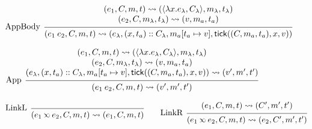 \documentclass[acmsmall,review]{acmart}\settopmatter{printfolios=true,printccs=false,printacmref=false}
\theoremstyle{definition}
\newcommand*{\cons}{::}
\newcommand*{\mem}{m}
\newcommand*{\semlink}{\mathbin{\rotatebox[origin=c]{180}{$\propto$}}}
\newcommand*{\link}[2]{{#1}\semlink{#2}}
\newcommand*{\tick}{\mathsf{tick}}
\begin{document}
\begin{figure}[h!]
  \[
    \begin{prooftree}
      \hypo{
        \begin{matrix}
          (e_{1}, C, \mem, t)
          \rightsquigarrow
          (\langle\lambda x.e_{\lambda}, C_{\lambda}\rangle, \mem_{\lambda}, t_{\lambda}) \\
          (e_{2}, C, \mem_{\lambda}, t_{\lambda})
          \rightsquigarrow
          (v, \mem_{a}, t_{a})
        \end{matrix}
      }
      \infer[left label={AppBody}]1{
      (e_{1}\:e_{2}, C, \mem, t)
      \rightsquigarrow
      (e_{\lambda}, (x, t_{a})\cons C_{\lambda}, \mem_{a}[t_{a}\mapsto v], \tick((C,\mem_{a},t_{a}),x,v))
      }
    \end{prooftree}
  \]

  \[
    \begin{prooftree}
      \hypo{
        \begin{matrix}
          (e_{1}, C, \mem, t)
          \rightsquigarrow
          (\langle\lambda x.e_{\lambda}, C_{\lambda}\rangle, \mem_{\lambda}, t_{\lambda}) \\
          (e_{2}, C, \mem_{\lambda}, t_{\lambda})
          \rightsquigarrow
          (v, \mem_{a}, t_{a})                                                            \\
          (e_{\lambda}, (x, t_{a})\cons C_{\lambda}, \mem_{a}[t_{a}\mapsto v], \tick((C,\mem_{a},t_{a}),x,v))
          \rightsquigarrow
          (v', \mem',t')
        \end{matrix}
      }
      \infer[left label={App}]1{
      (e_{1}\:e_{2}, C, \mem, t)
      \rightsquigarrow
      (v', \mem',t')
      }
    \end{prooftree}
  \]

  \[
    \begin{prooftree}
      \infer[left label=LinkL]0{
      (\link{e_{1}}{e_{2}}, C, \mem, t)
      \rightsquigarrow
      (e_{1}, C, \mem, t)
      }
    \end{prooftree}\qquad
    \begin{prooftree}
      \hypo{
        \begin{matrix}
          (e_{1}, C, \mem, t)
          \rightsquigarrow
          (C', \mem', t')
        \end{matrix}
      }
      \infer[left label=LinkR]1{
      (\link{e_{1}}{e_{2}}, C, \mem, t)
      \rightsquigarrow
      (e_{2}, C', \mem', t')
      }
    \end{prooftree}
  \]


\end{figure}
\end{document}

